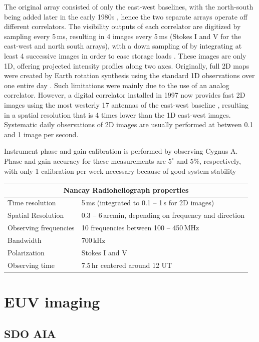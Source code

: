 The original array consisted of only the east-west baselines, with the north-south being added later in the early 1980s \citep{bonmartin1983}, hence the two separate arrays operate off different correlators. The visibility outputs of each correlator are digitized by sampling every 5\,ms, resulting in 4 images every 5\,ms (Stokes I and V for the east-west and north south arrays), with a down sampling of by integrating at least 4 successive images in order to ease storage loads \citep{avignon1989}. These images are only 1D, offering projected intensity profiles along two axes. Originally, full 2D maps were created by Earth rotation synthesis using the standard 1D observations over one entire day \citep{nrh1993}. Such limitations were mainly due to the use of an analog correlator. However, a digital correlator installed in 1997 now provides fast 2D images using the most westerly 17 antennas of the east-west baseline \citep{kerdraon1997}, resulting in a spatial resolution that is 4 times lower than the 1D east-west images. Systematic daily observations of 2D images are usually performed at between 0.1 and 1 image per second.

Instrument phase and gain calibration is performed by observing Cygnus A. Phase and gain accuracy for these measurements are $5^{\circ}$ and 5\%, respectively, with only 1 calibration per week necessary because of good system stability \citep{avignon1989}

\begin{tabular}{ |l|l| }
  \hline
  \multicolumn{2}{|c|}{Nancay Radioheliograph properties} \\
  \hline
  Time resolution & 5\,ms (integrated to 0.1 -- 1\,s for 2D images) \\
  Spatial Resolution & 0.3 -- 6\,arcmin, depending on frequency and direction \\
  Observing frequencies & 10 frequencies between 100 -- 450\,MHz \\
  Bandwidth & 700\,kHz \\
  Polarization & Stokes I and V \\
  Observing time & 7.5\,hr centered around 12 UT \\
  \hline
\end{tabular}





\section{EUV imaging}\label{sec:4}

\subsection{SDO AIA}\label{sec:40}



